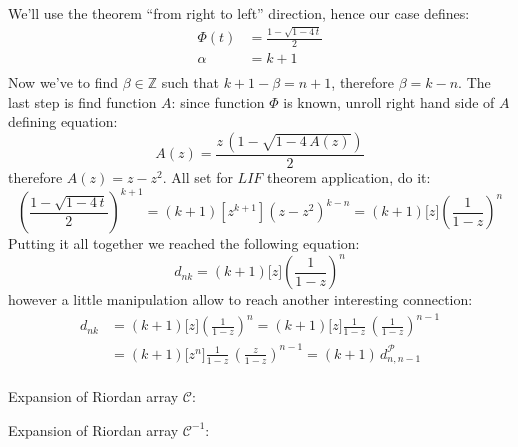 \documentclass[11pt,a4paper]{article} %
\begin{document}
    We'll use the theorem ``from right to left'' direction, hence our case
    defines:
    \begin{displaymath}
        \begin{split}
            \Phi(t)&=\frac{1-\sqrt{1-4\,t}}{2}\\
            \alpha&=k+1\\
        \end{split}
    \end{displaymath}
    Now we've to find $\beta\in\mathbb{Z}$ such that $k+1-\beta=n+1$, 
    therefore $\beta=k-n$. The last step is find function $A$: since
    function $\Phi$ is known, unroll right hand side of $A$ defining
    equation:
    \begin{displaymath} 
        A(z)=\frac{z\,\left(1-\sqrt{1-4\,A(z)}\right)}{2}
    \end{displaymath}
    therefore $A(z)=z-z^2$. All set for $LIF$ theorem application, 
    do it:
    \begin{displaymath}
        [t^{n+1}] \left(\frac{1-\sqrt{1-4\,t}}{2}\right)^{k+1} 
            = (k+1)\left[z^{k+1}\right]\left(z-z^2\right)^{k-n}
            = (k+1)\big[z\big]\left(\frac{1}{1-z}\right)^{n}
    \end{displaymath}
    Putting it all together we reached the following equation:
    \begin{displaymath}
        d_{nk} = (k+1)\big[z\big]\left(\frac{1}{1-z}\right)^{n}
    \end{displaymath}
    however a little manipulation allow to reach another 
    interesting connection:
    \begin{displaymath}
        \begin{split}
            d_{nk} &= (k+1)\big[z\big]\left(\frac{1}{1-z}\right)^{n}
                       = (k+1)\big[z\big]\frac{1}{1-z}\,\left(\frac{1}{1-z}\right)^{n-1}\\
                   &= (k+1)\big[z^{n}\big]\frac{1}{1-z}\,\left(\frac{z}{1-z}\right)^{n-1}
                       = (k+1)\,d_{n,n-1}^{\mathcal{P}}\\
        \end{split}
    \end{displaymath}




    Expansion of Riordan array $\mathcal{C}$:
    
    Expansion of Riordan array $\mathcal{C}^{-1}$:
    
\end{document}
